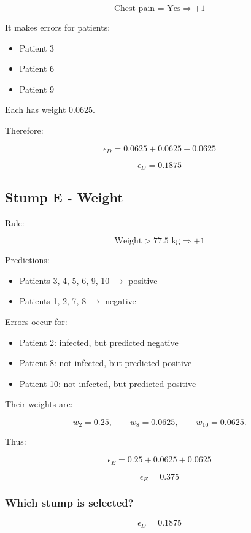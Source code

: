 \documentclass[10pt]{article}
\begin{document}
\[
\text{Chest pain = Yes}\Rightarrow+1
\]

It makes errors for patients:

\begin{itemize}
\item
Patient 3

\item
Patient 6

\item
Patient 9

\end{itemize}
Each has weight 0.0625.

Therefore:

\[
\epsilon_D
=
0.0625+0.0625+0.0625
\]

\[
{\epsilon_D=0.1875}
\]

\subsection*{Stump E - Weight}
Rule:

\[
\text{Weight}>77.5\text{ kg}\Rightarrow+1
\]

Predictions:

\begin{itemize}
\item
Patients 3, 4, 5, 6, 9, 10 $\to$ positive

\item
Patients 1, 2, 7, 8 $\to$ negative

\end{itemize}
Errors occur for:

\begin{itemize}
\item
Patient 2: infected, but predicted negative

\item
Patient 8: not infected, but predicted positive

\item
Patient 10: not infected, but predicted positive

\end{itemize}
Their weights are:

\[
w_2=0.25,\qquad
w_8=0.0625,\qquad
w_{10}=0.0625.
\]

Thus:

\[
\epsilon_E
=
0.25+0.0625+0.0625
\]

\[
{\epsilon_E=0.375}
\]

\subsubsection*{Which stump is selected?}
\[
\epsilon_D=0.1875
\]
\end{document}
